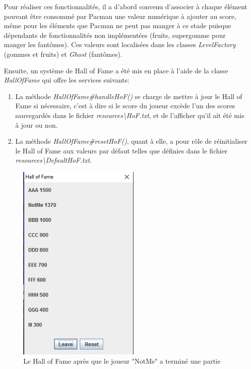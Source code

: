 \documentclass[12pt, openany]{report}
\begin{document}
Pour réaliser ces fonctionnalités, il a d'abord convenu d'associer à chaque élément pouvant être consommé par Pacman une valeur numérique à ajouter au score, même pour les éléments que Pacman ne peut pas manger à ce stade puisque dépendants de fonctionnalités non implémentées (fruits, supergomme pour manger les fantômes).
Ces valeurs sont localisées dans les classes \mbox{\textit{LevelFactory}} (gommes et fruits) et \mbox{\textit{Ghost}} (fantômes).

Ensuite, un système de Hall of Fame a été mis en place à l'aide de la classe \mbox{\textit{HallOfFame}} qui offre les services suivants:

\begin{enumerate}
\item La méthode \mbox{\textit{HallOfFame\#handleHoF()}} se charge de mettre à jour le Hall of Fame si nécessaire, c'est à dire si le score du joueur excède l'un des scores sauvegardés dans le fichier \mbox{\textit{resources\textbackslash HoF.txt}}, et de l'afficher qu'il ait été mis à jour ou non.
\item La méthode \mbox{\textit{HallOfFame\#resetHoF()}}, quant à elle, a pour rôle de réinitialiser le Hall of Fame aux valeurs par défaut telles que définies dans le fichier \mbox{\textit{resources\textbackslash DefaultHoF.txt}}.
\end{enumerate}

\begin{figure}[h]
	\centering
	\includegraphics[width=6cm]{Images/HoF.png}
	\caption{\label{hof} Le Hall of Fame après que le joueur "NotMe" a terminé une partie}
\end{figure}
\end{document}
